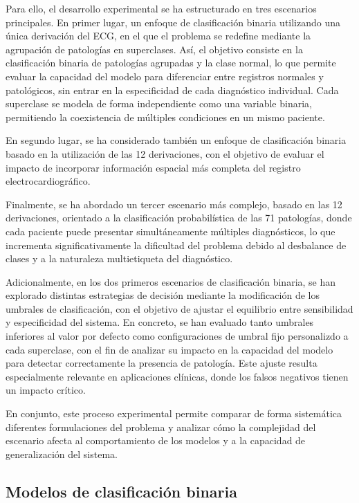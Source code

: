 \documentclass[12pt,a4paper,twoside]{book}
\begin{document}
Para ello, el desarrollo experimental se ha estructurado en tres escenarios principales. 
En primer lugar, un enfoque de clasificación binaria utilizando una única derivación del ECG, en el que el problema se redefine mediante la agrupación de patologías en superclases. 
Así, el objetivo consiste en la clasificación binaria de patologías agrupadas y la clase normal, lo que permite evaluar la capacidad del modelo para diferenciar entre registros normales y patológicos, sin entrar en la especificidad de cada diagnóstico individual.
Cada superclase se modela de forma independiente como una variable binaria, permitiendo la coexistencia de múltiples condiciones en un mismo paciente.

En segundo lugar, se ha considerado también un enfoque de clasificación binaria basado en la utilización de las 12 derivaciones, con el objetivo de evaluar el impacto de incorporar información espacial más completa del registro electrocardiográfico. 

Finalmente, se ha abordado un tercer escenario más complejo, basado en las 12 derivaciones, orientado a la clasificación probabilística de las 71 patologías, donde cada paciente puede presentar simultáneamente múltiples diagnósticos, lo que incrementa significativamente la dificultad del problema debido al desbalance de clases y a la naturaleza multietiqueta del diagnóstico.

Adicionalmente, en los dos primeros escenarios de clasificación binaria, se han explorado distintas estrategias de decisión mediante la modificación de los umbrales de clasificación, con el objetivo de ajustar el equilibrio entre sensibilidad y especificidad del sistema. 
En concreto, se han evaluado tanto umbrales inferiores al valor por defecto como configuraciones de umbral fijo personalizdo a cada superclase, con el fin de analizar su impacto en la capacidad del modelo para detectar correctamente la presencia de patología. 
Este ajuste resulta especialmente relevante en aplicaciones clínicas, donde los falsos negativos tienen un impacto crítico.

En conjunto, este proceso experimental permite comparar de forma sistemática diferentes formulaciones del problema y analizar cómo la complejidad del escenario afecta al comportamiento de los modelos y a la capacidad de generalización del sistema.

\subsection{Modelos de clasificación binaria}
\end{document}
